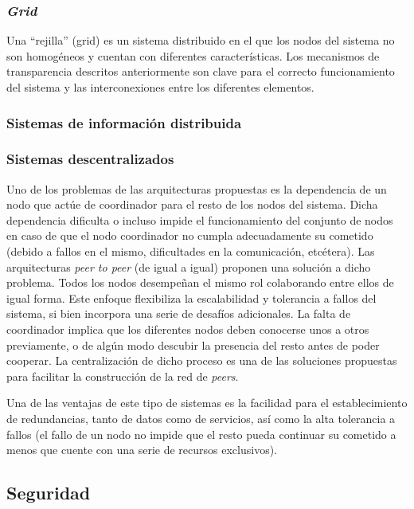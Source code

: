 \subsubsection{\textit{Grid}}

Una ``rejilla'' (grid) es un sistema distribuido en el que los nodos del sistema no son homogéneos y cuentan con diferentes características. Los mecanismos de transparencia descritos anteriormente son clave para el correcto funcionamiento del sistema y las interconexiones entre los diferentes elementos.

\subsubsection{Sistemas de información distribuida}

\subsubsection{Sistemas descentralizados}

Uno de los problemas de las arquitecturas propuestas es la dependencia de un nodo que actúe de coordinador para el resto de los nodos del sistema. Dicha dependencia dificulta o incluso impide el funcionamiento del conjunto de nodos en caso de que el nodo coordinador no cumpla adecuadamente su cometido (debido a fallos en el mismo, dificultades en la comunicación, etcétera). Las arquitecturas \textit{peer to peer} (de igual a igual) proponen una solución a dicho problema. Todos los nodos desempeñan el mismo rol colaborando entre ellos de igual forma. Este enfoque flexibiliza la escalabilidad y tolerancia a fallos del sistema, si bien incorpora una serie de desafíos adicionales. La falta de coordinador implica que los diferentes nodos deben conocerse unos a otros previamente, o de algún modo descubir la presencia del resto antes de poder cooperar. La centralización de dicho proceso es una de las soluciones propuestas para facilitar la construcción de la red de \textit{peers}.

Una de las ventajas de este tipo de sistemas es la facilidad para el establecimiento de redundancias, tanto de datos como de servicios, así como la alta tolerancia a fallos (el fallo de un nodo no impide que el resto pueda continuar su cometido a menos que cuente con una serie de recursos exclusivos).

\subsection{Seguridad}

